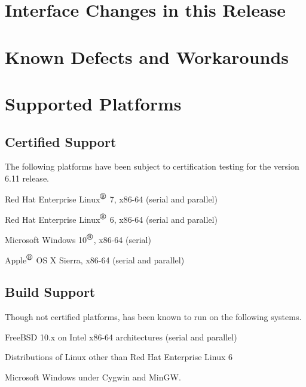 \documentclass[letterpaper]{scrartcl}
\begin{document}
\newpage
\section{Interface Changes in this Release}



\newpage
\section{Known Defects and Workarounds}



\newpage
\section{Supported Platforms}
\subsection*{Certified Support}
The following platforms have been subject to certification testing for the
\Xyce{} version 6.11 release.
\begin{XyceItemize}
  \item Red Hat Enterprise Linux${}^{\mbox{\textregistered}}$ 7, x86-64 (serial and parallel)
  \item Red Hat Enterprise Linux${}^{\mbox{\textregistered}}$ 6, x86-64 (serial and parallel)
  \item Microsoft Windows 10${}^{\mbox{\textregistered}}$, x86-64 (serial)
  \item Apple${}^{\mbox{\textregistered}}$ OS X Sierra, x86-64 (serial and parallel)
\end{XyceItemize}

\subsection*{Build Support}
Though not certified platforms, \Xyce{} has been known to run on the following
systems.
\begin{XyceItemize}
  \item FreeBSD 10.x on Intel x86-64 architectures (serial and parallel)
  \item Distributions of Linux other than Red Hat Enterprise Linux 6
  \item Microsoft Windows under Cygwin and MinGW.
\end{XyceItemize}
\end{document}
